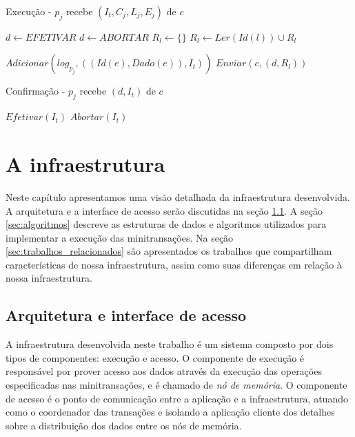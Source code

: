 \documentclass[11pt,twoside,a4paper]{book}
\begin{document}
\begin{algorithm}
\caption{Execução - $p_j$ recebe $(I_t, C_j, L_j, E_j)$ de $c$}
\label{alg:mini_participante1}
\begin{algorithmic}[1]
\State $d \gets EFETIVAR$
		\State $d \gets ABORTAR$
	\EndIf
\EndFor
\State $R_l \gets \{\}$
		\State $R_l \gets Ler(Id(l)) \cup R_l$
	\EndFor
	
		\State $Adicionar(log_{p_j}, ( (Id(e), Dado(e)), I_t ) )$
	\EndFor
\EndIf
\State $Enviar(c, (d, R_l))$
\end{algorithmic}
\end{algorithm}

\begin{algorithm}
\caption{Confirmação - $p_j$ recebe $(d, I_t)$ de $c$}
\label{alg:mini_participante2}
\begin{algorithmic}[1]
	\State $Efetivar(I_t)$
\Else
	\State $Abortar(I_t)$
\EndIf
\end{algorithmic}
\end{algorithm}

\chapter{A infraestrutura}
\label{chap:implementacao}
Neste capítulo apresentamos uma visão detalhada da infraestrutura desenvolvida. A arquitetura e a interface de acesso serão discutidas na seção \ref{sec:arquitetura}. A seção \ref{sec:algoritmos} descreve as estruturas de dados e algoritmos utilizados para implementar a execução das minitransações. Na seção \ref{sec:trabalhos_relacionados} são apresentados os trabalhos que compartilham características de nossa infraestrutura, assim como suas diferenças em relação à nossa infraestrutura. 


\section{Arquitetura e interface de acesso}
\label{sec:arquitetura}

A infraestrutura desenvolvida neste trabalho é um sistema composto por dois tipos de componentes: execução e acesso. O componente de execução é responsável por prover acesso aos dados através da execução das operações especificadas nas minitransações, e é chamado de \emph{nó de memória}. O componente de acesso é o ponto de comunicação entre a aplicação e a infraestrutura, atuando como o coordenador das transações e isolando a aplicação cliente dos detalhes sobre a distribuição dos dados entre os nós de memória.
\end{document}
